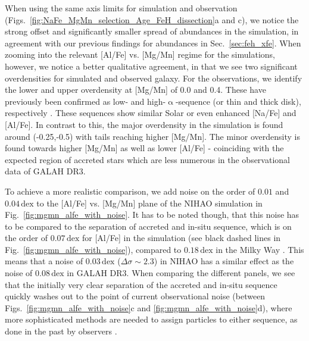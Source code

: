 \documentclass[fleqn,usenatbib]{mnras}
\begin{document}
When using the same axis limits for simulation and observation (Figs.~\ref{fig:NaFe_MgMn_selection_Age_FeH_dissection}a and c), we notice the strong offset and significantly smaller spread of abundances in the simulation, in agreement with our previous findings for abundances in Sec.~\ref{sec:feh_xfe}. When zooming into the relevant [Al/Fe] vs. [Mg/Mn] regime for the simulations, however, we notice a better qualitative agreement, in that we see two significant overdensities for simulated and observed galaxy. For the observations, we identify the lower and upper overdensity at [Mg/Mn] of 0.0 and 0.4. These have previously been confirmed as low- and high-$\upalpha$-sequence (or thin and thick disk), respectively \citep{Hawkins2015, Buder2022}. These sequences show similar Solar or even enhanced [Na/Fe] and [Al/Fe]. In contrast to this, the major overdensity in the simulation is found around (-0.25,-0.5) with tails reaching higher [Mg/Mn]. The minor overdensity is found towards higher [Mg/Mn] as well as lower [Al/Fe] - coinciding with the expected region of accreted stars \citep{Horta2021} which are less numerous in the observational data of GALAH DR3.

To achieve a more realistic comparison, we add noise on the order of $0.01$ and $0.04\,\mathrm{dex}$ to the [Al/Fe] vs. [Mg/Mn] plane of the NIHAO simulation in Fig.~\ref{fig:mgmn_alfe_with_noise}. It has to be noted though, that this noise has to be compared to the separation of accreted and in-situ sequence, which is on the order of $0.07\,\mathrm{dex}$ for [Al/Fe] in the simulation (see black dashed lines in Fig.~\ref{fig:mgmn_alfe_with_noise}), compared to $0.18\,\mathrm{dex}$ in the Milky Way \citep[][see their Tab.~4]{Buder2022}. This means that a noise of $0.03\,\mathrm{dex}$ ($\Delta \sigma \sim 2.3$) in NIHAO has a similar effect as the noise of $0.08\,\mathrm{dex}$ in GALAH DR3. When comparing the different panels, we see that the initially very clear separation of the accreted and in-situ sequence quickly washes out to the point of current observational noise (between Figs.~\ref{fig:mgmn_alfe_with_noise}c and \ref{fig:mgmn_alfe_with_noise}d), where more sophisticated methods are needed to assign particles to either sequence, as done in the past by observers \citep{Das2020, Buder2022}.
\end{document}
